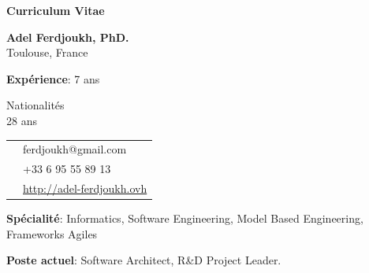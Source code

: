 \thispagestyle{empty}

\renewcommand\refname{~}

\begin{center}
\par\textbf{\huge Curriculum Vitae}
\end{center}

\vspace{.5cm}

\begin{minipage}{0.45\textwidth}
\textbf{Adel Ferdjoukh, PhD.} \\ 
Toulouse, France

\vspace{.3cm}

{\bf Expérience}: 7 ans

\medskip

Nationalités \fr{} \dz{} \kab{} \\
28 ans \\

\begin{tabular}{cl}
\email{} & ferdjoukh@gmail.com\\

\phone{} & +33 6 95 55 89 13\\

\web{} & \url{http://adel-ferdjoukh.ovh}\\
\end{tabular}

\medskip
{\bf Spécialité}: Informatics, Software Engineering, Model Based Engineering, Frameworks Agiles

\medskip
{\bf Poste actuel}: Software Architect, R\&D Project Leader.


\end{minipage}
\hfill
